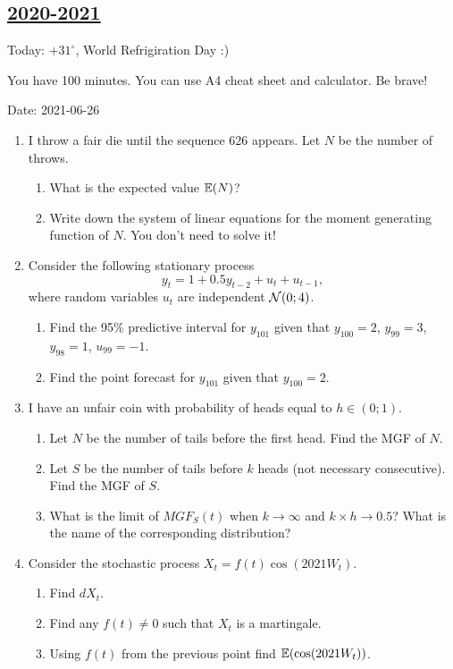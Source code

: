 \subsection[2020-2021]{\hyperref[sec:sol_kr_04_2020_2021]{2020-2021}}
\label{sec:kr_04_2020_2021} %

Today: $+31^{\circ}$,  World Refrigiration Day :)

You have 100 minutes. You can use A4 cheat sheet and calculator. Be brave! 

Date: 2021-06-26

\begin{enumerate}

\item I throw a fair die until the sequence 626 appears. Let $N$ be the number of throws.
\begin{enumerate}
    \item What is the expected value $\operatorname{\mathbb{E}}(N)$?
    \item Write down the system of linear equations for the moment generating function of $N$. You don't need to solve it!
\end{enumerate}
    

\item Consider the following stationary process
\[
y_t = 1 + 0.5 y_{t-2} + u_t + u_{t-1},    
\]
where random variables $u_t$ are independent $\mathcal{N}(0; 4)$.

\begin{enumerate}
    \item Find the 95\% predictive interval for $y_{101}$ given that $y_{100} = 2$, $y_{99} = 3$, $y_{98} = 1$, $u_{99} = -1$.
    \item Find the point forecast for $y_{101}$ given that $y_{100}=2$.
\end{enumerate}


\item I have an unfair coin with probability of heads equal to $h \in (0;1)$.
\begin{enumerate}
    \item Let $N$ be the number of tails before the first head. Find the MGF of $N$.
    \item Let $S$ be the number of tails before $k$ heads (not necessary consecutive). Find the MGF of $S$.
    \item What is the limit of $MGF_S(t)$ when $k \to \infty$ and $k \times h \to 0.5$? What is the name of the corresponding distribution?
\end{enumerate}


\item Consider the stochastic process $X_t = f(t) \cos (2021 W_t)$.
\begin{enumerate}
    \item Find $dX_t$.
    \item Find any $f(t) \neq 0$ such that $X_t$ is a martingale.
    \item Using $f(t)$ from the previous point find $\operatorname{\mathbb{E}}(\cos (2021 W_t))$.
\end{enumerate}




\end{enumerate}
